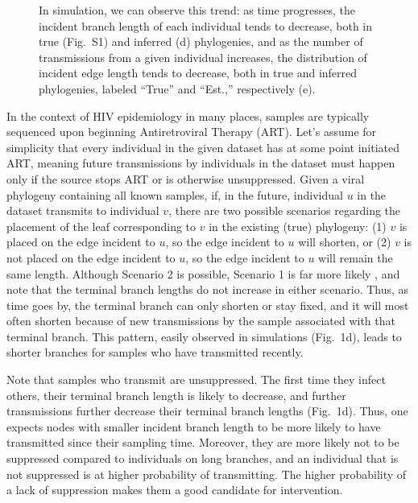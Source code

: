 \documentclass[oupdraft]{sysbio}
\newcommand{\PLWH}{sample\xspace}
\begin{document}
\begin{figure}[!tp]
{In simulation, we can observe this trend: as time progresses, the incident branch length of each individual tends to decrease, both in true (Fig.~S1) and inferred (d) phylogenies, and as the number of transmissions from a given individual increases, the distribution of incident edge length tends to decrease, both in true and inferred phylogenies, labeled ``True'' and ``Est.,'' respectively (e).}
\label{fig:diagram}
\end{figure}


In the context of HIV epidemiology in many places,
\PLWH{s} are typically sequenced
upon beginning Antiretroviral Therapy (ART).
Let's assume for simplicity that every individual in the given dataset has at some point initiated ART,
meaning future transmissions by individuals in the dataset must happen only if the source stops ART or is otherwise unsuppressed. %
Given a viral phylogeny containing all known \PLWH{s},
if, in the future,
individual $u$ in the dataset transmits to individual $v$,
there are two possible scenarios regarding the placement of the leaf corresponding to $v$ in the existing (true) phylogeny:
(1) $v$ is placed on the edge incident to $u$, so the edge incident to $u$ will shorten, or (2) $v$ is not placed on the edge incident to $u$, so the edge incident to $u$ will remain the same length.
Although Scenario 2 is possible,
Scenario 1 is far more likely \cite{Romero-Severson2016}, and note that the terminal branch lengths do not increase in either scenario. 
Thus, as time goes by, the terminal branch can only shorten or stay fixed, and it will most often shorten because of new transmissions by the \PLWH associated with that terminal branch.
This pattern, easily observed in simulations (Fig.~1d), leads to shorter branches for \PLWH{s} who have transmitted recently.

Note that \PLWH{s} who transmit are unsuppressed. The first time they infect others, their terminal branch length is likely to decrease, and further transmissions further decrease their terminal branch lengths (Fig.~1d). 
Thus, one expects nodes with smaller incident branch length to be more likely to have transmitted since their sampling time.
Moreover, they are more likely not to be  suppressed compared to individuals on long branches, and an individual that is not suppressed is at higher probability of transmitting. 
The higher probability of a lack of suppression makes them a good candidate for intervention. 
\end{document}
